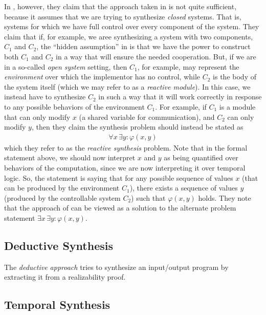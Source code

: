 \documentclass[10pt,a4paper]{article}
\begin{document}
In \cite{1989pnuelirosner}, however, they claim that the approach taken in \cite{1981clarkemerson, 1984mannawolper} is not quite sufficient, because it assumes that we are trying to synthesize \textit{closed} systems. That is, systems for which we have full control over every component of the system. They claim that if, for example, we aree synthesizing a system with two components, $C_1$ and $C_2$, the ``hidden assumption'' in \cite{1981clarkemerson} is that we have the power to construct both $C_1$ and $C_2$ in a way that will ensure the needed cooperation. But, if we are in a so-called \textit{open system} setting, then $C_1$, for example, may represent the \textit{environment} over which the implementor has no control, while $C_2$ is the body of the system itself (which we may refer to as a \textit{reactive module}). In this case, we instead have to synthesize $C_2$ in such a way that it will work correctly in response to any possible behaviors of the environment $C_1$. For example, if $C_1$ is a module that can only modify $x$ (a shared variable for communication), and $C_2$ can only modify $y$, then they claim the synthesis problem should instead be stated as
\begin{align*}
    \forall x \, \exists y : \varphi(x,y)
\end{align*}
which they refer to as the \textit{reactive synthesis} problem. Note that in the formal statement above, we should now interpret $x$ and $y$ as being quantified over behaviors of the computation, since we are now interpreting it over temporal logic. So, the statement is saying that for any possible sequence of values $x$ (that can be produced by the environment $C_1$), there exists a sequence of values $y$ (produced by the controllable system $C_2$) such that $\varphi(x,y)$ holds. They note that the approach of \cite{1981clarkemerson} can be viewed as a solution to the alternate problem statement $\exists x \, \exists y : \varphi(x,y)$.

\subsection{Deductive Synthesis}

The \textit{deductive approach} \cite{manna1980deductive} tries to synthesize an input/output program by extracting it from a realizability proof.

\subsection{Temporal Synthesis}
\end{document}
